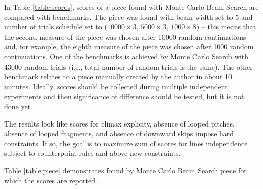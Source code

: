 \documentclass{article}
\begin{document}
In Table \ref{table:scores}, scores of a piece found with Monte Carlo Beam Search are compared with benchmarks. The piece was found with beam width set to 5 and number of trials schedule set to ($10000 \times 3$, $5000 \times 3$, $1000 \times 8$) -- this means that the second measure of the piece was chosen after 10000 random continuations and, for example, the eighth measure of the piece was chosen after 1000 random continuations. One of the benchmarks is achieved by Monte Carlo Search with 43000 random trials (i.e., total number of random trials is the same). The other benchmark relates to a piece manually created by the author in about 10 minutes. Ideally, scores should be collected during multiple independent experiments and then significance of difference should be tested, but it is not done yet.

The results look like scores for climax explicity, absence of looped pitches, absence of looped fragments, and absence of downward skips impose hard constraints. If so, the goal is to maximize sum of scores for lines independence subject to counterpoint rules and above new constraints.

Table \ref{table:piece} demonstrates found by Monte Carlo Beam Search piece for which the scores are reported.
\end{document}
